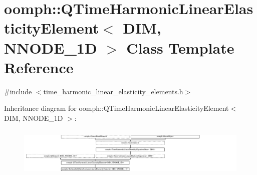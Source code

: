 \hypertarget{classoomph_1_1QTimeHarmonicLinearElasticityElement}{}\section{oomph\+:\+:Q\+Time\+Harmonic\+Linear\+Elasticity\+Element$<$ D\+IM, N\+N\+O\+D\+E\+\_\+1D $>$ Class Template Reference}
\label{classoomph_1_1QTimeHarmonicLinearElasticityElement}


{\ttfamily \#include $<$time\+\_\+harmonic\+\_\+linear\+\_\+elasticity\+\_\+elements.\+h$>$}

Inheritance diagram for oomph\+:\+:Q\+Time\+Harmonic\+Linear\+Elasticity\+Element$<$ D\+IM, N\+N\+O\+D\+E\+\_\+1D $>$\+:\begin{figure}[H]
\begin{center}
\leavevmode
\includegraphics[height=2.398287cm]{classoomph_1_1QTimeHarmonicLinearElasticityElement}
\end{center}
\end{figure}
